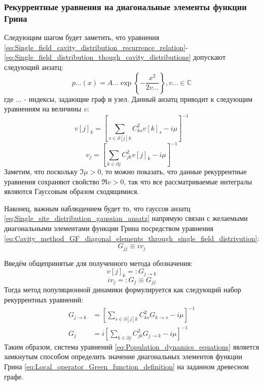 \subsubsection{Рекуррентные уравнения на диагональные элементы функции Грина}
Следующим шагом будет заметить, что уравнения \eqref{eq:Single_field_cavity_distribution_recurrence_relation}-\eqref{eq:Single_field_distribution_though_cavity_distributions} допускают следующий анзатц:
\begin{equation}
	\label{eq:Single_site_distribution_gaussian_ansatz}
	p...(x) = A... \exp\left\{- \frac{x^2}{2 v...} \right\}, v... \in \mathbb{C}
\end{equation}
где $...$ - индексы, задающие граф и узел. Данный анзатц приводит к следующим уравнениям на величины $v$:
\begin{equation}
	\label{eq:Cavity_amplitude_recurrence_relation}
	v[j]_k = \left[ \sum_{s \in \partial[j]k} C_{ks}^{2} v[k]_s - i\mu \right]^{-1}
\end{equation}
\begin{equation}
	\label{eq:Dispersion_though_cavity_amplitudes}
	v_j = \left[ \sum_{k \in \partial j} C_{jk}^{2} v[j]_k - i\mu \right]^{-1}
\end{equation}
Заметим, что поскольку $\Im \mu > 0$, то можно показать, что данные рекуррентные уравнения сохраняют свойство $\Re v > 0$, так что все рассматриваемые интегралы являются Гауссовым образом сходящимися.

Наконец, важным наблюдением будет то, что гауссов анзатц \eqref{eq:Single_site_distribution_gaussian_ansatz} напрямую связан с желаемыми диагональными элементами функции Грина посредством уравнения \eqref{eq:Cavity_method_GF_diagonal_elements_through_single_field_distrivution}:
$$
G_{jj} \equiv i v_j
$$

Введём общепринятые для полученного метода обозначения:
$$
v[j]_k =: G_{j \rightarrow k}
$$
$$
i v_j =: G_j \equiv G_{jj}
$$
Тогда метод популяционной динамики формулируется как следующий набор рекуррентных уравнений:
\begin{equation}
	\label{eq:Population_dynamics_equations}
	\begin{split}
		G_{j \rightarrow k} & = \left[ \sum_{s \in \partial[j]k} C_{ks}^{2} G_{k \rightarrow s} - i\mu \right]^{-1} \\
		G_j & = i \left[ \sum_{k \in \partial j} C_{jk}^{2} G_{j \rightarrow k} - i\mu \right]^{-1}
	\end{split}
\end{equation}
Таким образом, система уравнений \eqref{eq:Population_dynamics_equations} является замкнутым способом определить значение диагональных элементов функции Грина \eqref{eq:Local_operator_Green_function_definition} на заданном древесном графе.

